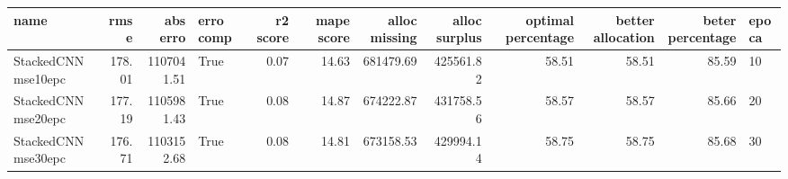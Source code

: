 \begin{tabular}{lrrlrrrrrrrl}
\toprule
name & rmse & abs erro & erro comp & r2 score & mape score & alloc missing & alloc surplus & optimal percentage & better allocation & beter percentage & epoca \\
\midrule
StackedCNNmse10epc & 178.01 & 1107041.51 & True & 0.07 & 14.63 & 681479.69 & 425561.82 & 58.51 & 58.51 & 85.59 & 10 \\
StackedCNNmse20epc & 177.19 & 1105981.43 & True & 0.08 & 14.87 & 674222.87 & 431758.56 & 58.57 & 58.57 & 85.66 & 20 \\
StackedCNNmse30epc & 176.71 & 1103152.68 & True & 0.08 & 14.81 & 673158.53 & 429994.14 & 58.75 & 58.75 & 85.68 & 30 \\
\bottomrule
\end{tabular}
